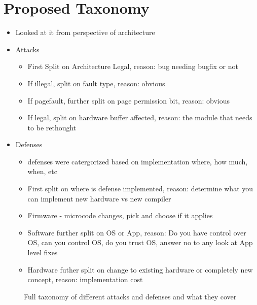 \section{Proposed Taxonomy}
\begin{itemize}
	\item Looked at it from perspective of architecture
	\item Attacks
		\begin{itemize}
			\item First Split on Architecture Legal, reason: bug needing bugfix or not
			\item If illegal, split on fault type, reason: obvious
			\item If pagefault, further split on page permission bit, reason: obvious
			\item If legal, split on hardware buffer affected, reason: the module that needs to be rethought
		\end{itemize}

	\item Defenses
		\begin{itemize}
			\item defenses were catergorized based on implementation where, how much, when, etc
			\item First split on where is defense implemented, reason: determine what you can implement new hardware vs new compiler
			\item Firmware - microcode changes, pick and choose if it applies
			\item Software further split on OS or App, reason: Do you have control over OS, can you control OS, do you trust OS, answer no to any look at App level fixes
			\item Hardware futher split on change to existing hardware or completely new concept, reason: implementation cost
		\end{itemize}

\end{itemize}

\begin{center}
\begin{figure}[!p]
    \caption{Full taxonomy of different attacks and defenses and what they cover}
    \label{fig:categorization}
\end{figure}
\afterpage{\clearpage}
\end{center}
